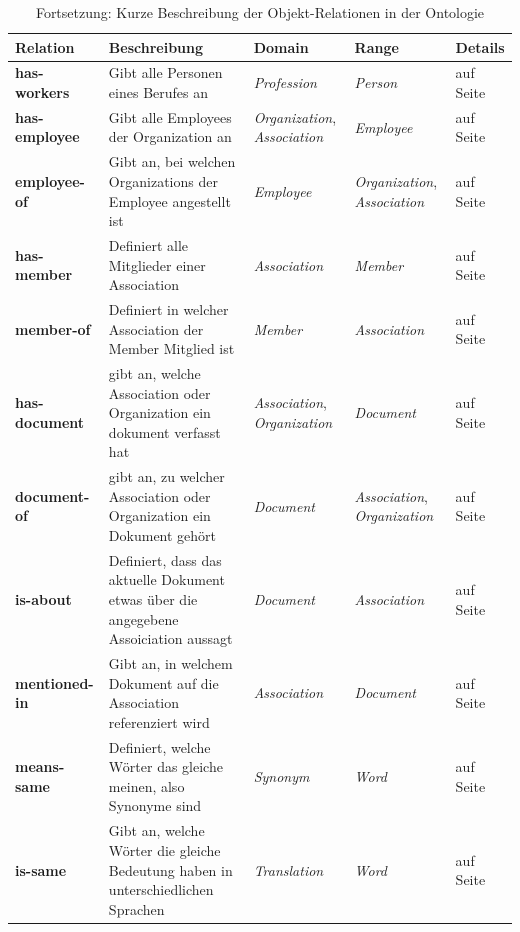 \documentclass[
    11pt,
    latin1,
    a4paper,
    oneside
]{scrreprt}
\begin{document}
\begin{table}[H]
  \centering
  \begin{tabular}{ | l | p{4cm} | p{3cm} | p{2cm} | p{2cm} | }
    \hline
    \textbf{Relation} & \textbf{Beschreibung} & \textbf{Domain} & \textbf{Range} & \textbf{Details} \\ \hline
    \textbf{has-workers} & Gibt alle Personen eines Berufes an & \emph{Profession} & \emph{Person} & \nameref{sec:rel_hasworkers} auf Seite \pageref{sec:rel_hasworkers} \\ \hline
    \textbf{has-employee} & Gibt alle Employees der Organization an & \emph{Organization}, \emph{Association} & \emph{Employee} & \nameref{sec:rel_hasemployee} auf Seite \pageref{sec:rel_hasemployee} \\ \hline
    \textbf{employee-of} & Gibt an, bei welchen Organizations der Employee angestellt ist & \emph{Employee} & \emph{Organization}, \emph{Association} & \nameref{sec:rel_employeeof} auf Seite \pageref{sec:rel_employeeof} \\ \hline
    \textbf{has-member} & Definiert alle Mitglieder einer Association & \emph{Association} & \emph{Member} & \nameref{sec:rel_hasmember} auf Seite \pageref{sec:rel_hasmember} \\ \hline
    \textbf{member-of} & Definiert in welcher Association der Member Mitglied ist & \emph{Member} & \emph{Association} & \nameref{sec:rel_memberof} auf Seite \pageref{sec:rel_memberof} \\ \hline
    \textbf{has-document} & gibt an, welche Association oder Organization ein dokument verfasst hat & \emph{Association}, \emph{Organization} & \emph{Document} & \nameref{sec:rel_hasdocument} auf Seite \pageref{sec:rel_hasdocument} \\ \hline
    \textbf{document-of} & gibt an, zu welcher Association oder Organization ein Dokument geh\"ort & \emph{Document} & \emph{Association}, \emph{Organization} & \nameref{sec:rel_documentof} auf Seite \pageref{sec:rel_documentof} \\ \hline
    \textbf{is-about} & Definiert, dass das aktuelle Dokument etwas \"uber die angegebene Assoiciation aussagt & \emph{Document} & \emph{Association} & \nameref{sec:rel_isabout} auf Seite \pageref{sec:rel_isabout} \\ \hline
    \textbf{mentioned-in} & Gibt an, in welchem Dokument auf die Association referenziert wird & \emph{Association} & \emph{Document} & \nameref{sec:rel_mentionedin} auf Seite \pageref{sec:rel_mentionedin} \\ \hline
    \textbf{means-same} & Definiert, welche W\"orter das gleiche meinen, also Synonyme sind & \emph{Synonym} & \emph{Word} & \nameref{sec:rel_meanssame} auf Seite \pageref{sec:rel_meanssame} \\ \hline
    \textbf{is-same} & Gibt an, welche W\"orter die gleiche Bedeutung haben in unterschiedlichen Sprachen & \emph{Translation} & \emph{Word} & \nameref{sec:rel_issame} auf Seite \pageref{sec:rel_issame} \\ \hline
  \end{tabular}
  \caption{Fortsetzung: Kurze Beschreibung der Objekt-Relationen in der Ontologie}
  \label{tbl:relations2}
\end{table}
\end{document}
